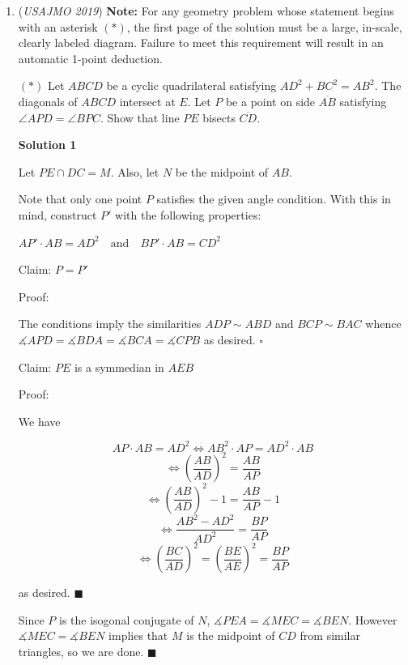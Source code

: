 \begin{enumerate}
 $|a|=|b|$ means that either $a=b$ or $a=-b$. $f(x)=x,g(x)=x+a$ works for the former and $f(x)=-x,g(x)=-x-a$ works for the latter, and we are done.

 


	\item (\textit{USAJMO 2019}) \textbf{Note:} For any geometry problem whose statement begins with an asterisk $(*)$, the first page of the solution must be a large, in-scale, clearly labeled diagram. Failure to meet this requirement will result in an automatic 1-point deduction.


 $(*)$  Let $ABCD$ be a cyclic quadrilateral satisfying $AD^2+BC^2=AB^2$. The diagonals of $ABCD$ intersect at $E$. Let $P$ be a point on side $\overline{AB}$ satisfying $\angle APD=\angle BPC$. Show that line $PE$ bisects $\overline{CD}$.


 



 



\textbf{Solution 1}

Let $PE \cap DC = M$. Also, let $N$ be the midpoint of $AB$.

 Note that only one point $P$ satisfies the given angle condition. With this in mind, construct $P'$ with the following properties:

 $AP' \cdot AB = AD^2 \quad \text{and} \quad BP' \cdot AB = CD^2$

 Claim: $P = P'$

 Proof:

 The conditions imply the similarities $ADP \sim ABD$ and $BCP \sim BAC$ whence $\measuredangle APD = \measuredangle BDA = \measuredangle BCA = \measuredangle CPB$ as desired. $\square$

 Claim: $PE$ is a symmedian in $AEB$

 Proof:

 We have 

 
 \[AP \cdot AB = AD^2 \iff AB^2 \cdot AP = AD^2 \cdot AB\]
 \[\iff \left( \frac{AB}{AD} \right)^2 = \frac{AB}{AP}\]
 \[\iff \left( \frac{AB}{AD} \right)^2 - 1 = \frac{AB}{AP} - 1\]
 \[\iff \frac{AB^2 - AD^2}{AD^2} = \frac{BP}{AP}\]
 \[\iff \left(\frac{BC}{AD} \right)^2 = \left(\frac{BE}{AE} \right)^2 = \frac{BP}{AP}\]

 as desired. $\blacksquare$

 Since $P$ is the isogonal conjugate of $N$, $\measuredangle PEA = \measuredangle MEC = \measuredangle BEN$. However $\measuredangle MEC = \measuredangle BEN$ implies that $M$ is the midpoint of $CD$ from similar triangles, so we are done. $\blacksquare$





\end{enumerate}
